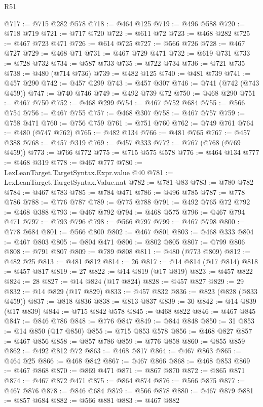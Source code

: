 \begin{lexlean}{R51}
\begin{coremodule}
@717 := @715 @282 @578
@718 := @464 @125
@719 := @496 @588
@720 := @718 @719
@721 := @717 @720
@722 := @611 @72
@723 := @468 @282
@725 := @467 @723 @471
@726 := @614 @725
@727 := @566 @726
@728 := @467 @727
@729 := @468 @71
@731 := @467 @729 @471
@732 := @619 @731
@733 := @728 @732
@734 := @587 @733
@735 := @722 @734
@736 := @721 @735
@738 := @480 (@714 @736)
@739 := @482 @125
@740 := @481 @739
@741 := @457 @290
@742 := @457 @299
@743 := @457 @307
@746 := @741 (@742 (@743 @459))
@747 := @740 @746
@749 := @492 @739 @72
@750 := @468 @290
@751 := @467 @750
@752 := @468 @299
@754 := @467 @752 @684
@755 := @566 @754
@756 := @467 @755
@757 := @468 @307
@758 := @467 @757
@759 := @758 @471
@760 := @756 @759
@761 := @751 @760
@762 := @749 @761
@764 := @480 (@747 @762)
@765 := @482 @134
@766 := @481 @765
@767 := @457 @388
@768 := @457 @319
@769 := @457 @333
@772 := @767 (@768 (@769 @459))
@773 := @766 @772
@775 := @715 @575 @578
@776 := @464 @134
@777 := @468 @319
@778 := @467 @777
@780 := LexLeanTarget.TargetSyntax.Expr.value @40
@781 := LexLeanTarget.TargetSyntax.Value.nat
@782 := @781 @83
@783 := @780 @782
@784 := @467 @783
@785 := @784 @471
@786 := @496 @785
@787 := @778 @786
@788 := @776 @787
@789 := @775 @788
@791 := @492 @765 @72
@792 := @468 @388
@793 := @467 @792
@794 := @468 @575
@796 := @467 @794 @471
@797 := @793 @796
@798 := @566 @797
@799 := @467 @798
@800 := @778 @684
@801 := @566 @800
@802 := @467 @801
@803 := @468 @333
@804 := @467 @803
@805 := @804 @471
@806 := @802 @805
@807 := @799 @806
@808 := @791 @807
@809 := @789 @808
@811 := @480 (@773 @809)
@812 := @482 @25
@813 := @481 @812
@814 := 26
@817 := @14 @814 (@17 @814)
@818 := @457 @817
@819 := 27
@822 := @14 @819 (@17 @819)
@823 := @457 @822
@824 := 28
@827 := @14 @824 (@17 @824)
@828 := @457 @827
@829 := 29
@832 := @14 @829 (@17 @829)
@833 := @457 @832
@836 := @823 (@828 (@833 @459))
@837 := @818 @836
@838 := @813 @837
@839 := 30
@842 := @14 @839 (@17 @839)
@844 := @715 @842 @578
@845 := @468 @822
@846 := @467 @845
@847 := @846 @786
@848 := @776 @847
@849 := @844 @848
@850 := 31
@853 := @14 @850 (@17 @850)
@855 := @715 @853 @578
@856 := @468 @827
@857 := @467 @856
@858 := @857 @786
@859 := @776 @858
@860 := @855 @859
@862 := @492 @812 @72
@863 := @468 @817
@864 := @467 @863
@865 := @464 @25
@866 := @468 @842
@867 := @467 @866
@868 := @468 @853
@869 := @467 @868
@870 := @869 @471
@871 := @867 @870
@872 := @865 @871
@874 := @467 @872 @471
@875 := @864 @874
@876 := @566 @875
@877 := @467 @876
@878 := @846 @684
@879 := @566 @878
@880 := @467 @879
@881 := @857 @684
@882 := @566 @881
@883 := @467 @882

\end{coremodule}
\end{lexlean}
